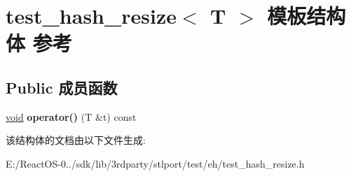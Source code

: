 \hypertarget{structtest__hash__resize}{}\section{test\+\_\+hash\+\_\+resize$<$ T $>$ 模板结构体 参考}
\label{structtest__hash__resize}
\subsection*{Public 成员函数}
\begin{DoxyCompactItemize}
\item 
\mbox{\label{structtest__hash__resize_a890de7e0e28144c5799e5c07d51e2bfb}} 
\hyperlink{interfacevoid}{void} {\bfseries operator()} (T \&t) const
\end{DoxyCompactItemize}


该结构体的文档由以下文件生成\+:\begin{DoxyCompactItemize}
\item 
E\+:/\+React\+O\+S-\/0../sdk/lib/3rdparty/stlport/test/eh/test\+\_\+hash\+\_\+resize.\+h\end{DoxyCompactItemize}
